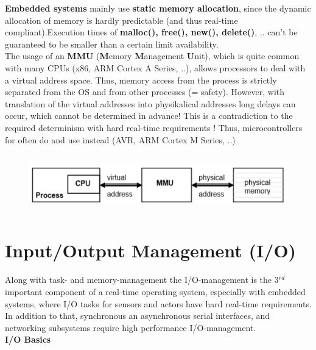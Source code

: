 \textbf{Embedded systems} mainly use \textbf{static memory allocation}, since the dynamic allocation of memory is hardly predictable (and thus real-time compliant).Execution times of \textbf{malloc(), free(), new(), delete()}, .. can't be guaranteed to be smaller than a certain limit  availability.\\

The usage of an \textbf{MMU} (\textbf{M}emory \textbf{M}anagement \textbf{U}nit), which is quite common with many CPUs (x86, ARM Cortex A Series, ..), allows processors to deal with a virtual address space. Thus, memory access from the process is strictly separated from the OS and from other processes (= safety). However, with translation of the virtual addresses into physikalical addresses long delays can occur, which cannot be determined in advance! This is a contradiction to the required determinism with hard real-time requirements ! Thus, microcontrollers for  often do \textbf{} and use  instead (AVR, ARM Cortex M Series, ..) 

 	\begin{figure}[h]
    \centering
    \includegraphics[width=12cm, height=2.5cm]{Images/image119.png}
    \label{fig:Fig }
    \end{figure}
    
\section{Input/Output Management (I/O)}

Along with task- and memory-management the\textbf{ }I/O-management is the 3${}^{rd}$  important component of a real-time operating system, especially with embedded systems, where I/O tasks for sensors and actors have hard real-time requirements.\\

In addition to that, synchronous an asynchronous serial interfaces, and networking subsystems require high performance I/O-management.\\

{\rot\bf I/O Basics}\\

